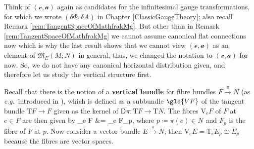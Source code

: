 Think of $(\mathcal{v}, \mathcal{a})$ again as candidates for the infinitesimal gauge transformations, for which we wrote $(\delta \Phi, \delta A)$ in Chapter \ref{ClassicGaugeTheory}; also recall Remark \ref{rem:TangentSpaceOfMathfrakMg}. But other than in Remark \ref{rem:TangentSpaceOfMathfrakMg} we cannot assume canonical flat connections now which is why the last result shows that we cannot view $(\mathcal{v}, \mathcal{a})$ as an element of $\mathfrak{M}_E(M;N)$ in general, thus, we changed the notation to $(\mathcal{v}, \mathcal{a})$ for now. So, we do not have any canonical horizontal distribution given, and therefore let us study the vertical structure first.

Recall that there is the notion of a \textbf{vertical bundle} for fibre bundles $F \stackrel{\pi}{\to} N$ (as \textit{e.g.}~introduced in \cite[\S 5.1.1, for principal bundles, but it is straightforward to extend the definitions; page 258ff.]{hamilton}), which is defined as a subbundle $\gls{VF}$ of the tangent bundle $\mathrm{T}F \to F$ given as the kernel of $\mathrm{D}\pi : \mathrm{T}F \to \mathrm{T}N$. The fibres $\mathrm{V}_eF$ of $F$ at $e \in F$ are then given by 
\bas
{}_e F
&=
_e F_p,
\eas
where $p \coloneqq \pi(e) \in N$ and $F_p$ is the fibre of $F$ at $p$.
Now consider a vector bundle $E \stackrel{\pi}{\to} N$, then $\mathrm{V}_e E = \mathrm{T}_e E_p \cong E_p$ because the fibres are vector spaces.

